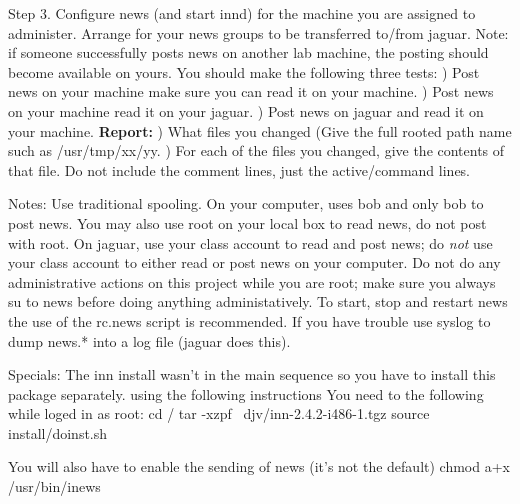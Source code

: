 Step 3. Configure news (and start {\ltt{}innd}) for the machine you are
assigned to administer.
Arrange for your news groups to be transferred to/from {\ltt{}jaguar}.
Note: if someone successfully posts news on another lab machine, the posting
should become available on yours.
You should make the following three tests:
\hfill{}) Post news on your machine make sure you can read it
on your machine.
\hfill{}) Post news on your machine read it on your {\ltt{}jaguar}.
\hfill{}) Post news on {\ltt{}jaguar} and read it on your machine.
\hfill\break
{\bf Report:}
\hfill{}) What files you changed (Give the full rooted path name such as
{\ltt{}/usr/tmp/xx/yy}.
\hfill{}) For each of the files you changed, give the contents of that file.
Do not include the comment lines, just the active/command lines.

Notes: Use traditional spooling. On your computer, uses {\ltt{}bob}
and only {\ltt{}bob} to post news. You may also use root on
your local box to read news, do not post with root.
On jaguar, use your class account to read and post news;
do {\it not} use your class account to either read or post news on your
computer. Do not do any administrative actions on this project
while you are root; make sure you always {\ltt{}su} to news before
doing anything administatively. To start, stop and restart news
the use of the {\ltt{}rc.news} script is recommended.
If you have trouble use syslog to dump {\ltt{}news.*} into a log file
({\ltt{}jaguar} does this).

Specials:
The inn install wasn't in the main sequence so you have to
install this package separately. using the following instructions
You need to the following while loged in as root:
\hfill\break
{\ltt{}cd /}
\hfill\break
{\ltt{}tar -xzpf ~djv/inn-2.4.2-i486-1.tgz}
\hfill\break
{\ltt{}source install/doinst.sh}

You will also have to enable the sending of news (it's not the default)
\hfill\break
{\ltt{}chmod a+x /usr/bin/inews}

\bye
